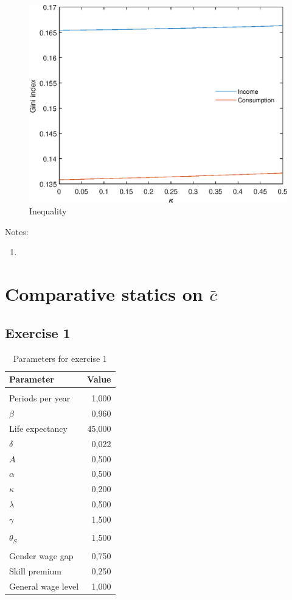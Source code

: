 \documentclass[12pt]{article}
\begin{document}
\begin{figure}
	\centering
	\caption{Inequality}
	\includegraphics{Graphs/ineq_kappa_ex1.eps}
\end{figure}

Notes:

\begin{enumerate}
	\item 
\end{enumerate}

\clearpage

\section{Comparative statics on $\bar{c}$}

\subsection{Exercise 1}

\begin{table}[htbp]
	\centering
	\caption{Parameters for exercise 1}
	\begin{tabular}{lr}
		\toprule
		Parameter & \multicolumn{1}{l}{Value} \\
		\midrule
		&  \\
		Periods per year & 1,000 \\
		$\beta$ & 0,960 \\
		Life expectancy & 45,000 \\
		$\delta$ & 0,022 \\
		$A$ & 0,500 \\
		$\alpha$ & 0,500 \\
		$\kappa$ & 0,200 \\
		$\lambda$ & 0,500 \\
		$\gamma$ & 1,500 \\
		&  \\
		$\theta_S$ & 1,500 \\
		&  \\
		Gender wage gap & 0,750 \\
		Skill premium & 0,250 \\
		General wage level & 1,000 \\
		\bottomrule
	\end{tabular}
\end{table}
\end{document}
